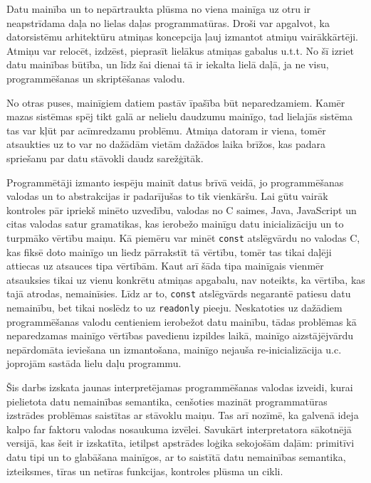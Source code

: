 \documentclass[12pt,a4paper]{report}
\begin{document}
Datu mainība un to nepārtraukta plūsma no viena mainīga uz otru ir neapstrīdama daļa no lielas daļas programmatūras. Droši var apgalvot, ka datorsistēmu arhitektūru atmiņas koncepcija ļauj izmantot atmiņu vairākkārtēji. Atmiņu var relocēt, izdzēst, pieprasīt lielākus atmiņas gabalus u.t.t. No šī izriet datu mainības būtība, un līdz šai dienai tā ir iekalta lielā daļā, ja ne visu, programmēšanas un skriptēšanas valodu.   

No otras puses, mainīgiem datiem pastāv īpašība būt neparedzamiem. Kamēr mazas sistēmas spēj tikt galā ar nelielu daudzumu mainīgo, tad lielajās sistēma tas var kļūt par acīmredzamu problēmu. Atmiņa datoram ir viena, tomēr atsaukties uz to var no dažādām vietām dažādos laika brīžos, kas padara spriešanu par datu stāvokli daudz sarežģītāk.  

Programmētāji izmanto iespēju mainīt datus brīvā veidā, jo  programmēšanas valodas un to abstrakcijas ir padarījušas to tik vienkāršu. Lai gūtu vairāk kontroles pār ipriekš minēto uzvedību, valodas no C saimes, Java, JavaScript un citas valodas satur gramatikas, kas ierobežo mainīgu datu inicializāciju un to turpmāko vērtību maiņu. Kā piemēru var minēt \texttt{const} atslēgvārdu no valodas C, kas fiksē doto mainīgo un liedz pārrakstīt tā vērtību, tomēr tas tikai daļēji attiecas uz atsauces tipa vērtībām. Kaut arī šāda tipa mainīgais vienmēr atsauksies tikai uz vienu konkrētu atmiņas apgabalu, nav noteikts, ka vērtība, kas tajā atrodas, nemainīsies. Līdz ar to, \texttt{const} atslēgvārds negarantē patiesu datu nemainību, bet tikai noslēdz to uz \texttt{readonly} pieeju.
Neskatoties uz dažādiem programmēšanas valodu centieniem ierobežot datu mainību, tādas problēmas kā neparedzamas mainīgo vērtības pavedienu izpildes laikā, mainīgo aizstājējvārdu nepārdomāta ieviešana un izmantošana, mainīgo nejauša re-inicializācija u.c. joprojām sastāda lielu daļu programmu.\cite{immutability}

Šis darbs izskata jaunas interpretējamas programmēšanas valodas izveidi, kurai pielietota datu nemainības semantika, cenšoties mazināt programmatūras izstrādes problēmas saistītas ar stāvoklu maiņu. Tas arī nozīmē, ka galvenā ideja kalpo far faktoru valodas nosaukuma izvēlei. Savukārt interpretatora sākotnējā versijā, kas šeit ir izskatīta, ietilpst apstrādes loģika sekojošām daļām: primitīvi datu tipi un to glabāšana mainīgos, ar to saistītā datu nemainības semantika, izteiksmes, tīras un netīras funkcijas, kontroles plūsma un cikli.

\end{document}
